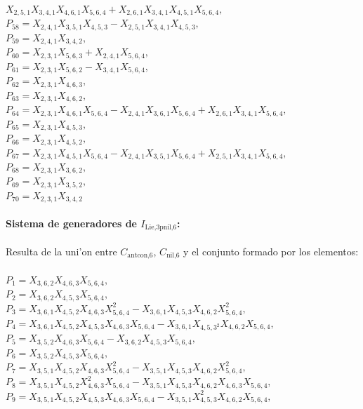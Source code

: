 \documentclass[10pt]{beamer}
\begin{document}
{$X_{2,5,1}X_{3,4,1}X_{4,6,1}X_{5,6,4}+X_{2,6,1}X_{3,4,1}X_{4,5,1}X_{5,6,4},$\\
$P_{58}=X_{2,4,1}X_{3,5,1}X_{4,5,3}-X_{2,5,1}X_{3,4,1}X_{4,5,3},$\\
$P_{59}=X_{2,4,1}X_{3,4,2},$\\
$P_{60}=X_{2,3,1}X_{5,6,3}+X_{2,4,1}X_{5,6,4},$\\
$P_{61}=X_{2,3,1}X_{5,6,2}-X_{3,4,1}X_{5,6,4},$\\
$P_{62}=X_{2,3,1}X_{4,6,3},$\\
$P_{63}=X_{2,3,1}X_{4,6,2},$\\
$P_{64}=X_{2,3,1}X_{4,6,1}X_{5,6,4}-X_{2,4,1}X_{3,6,1}X_{5,6,4}+X_{2,6,1}X_{3,4,1}X_{5,6,4},$\\
$P_{65}=X_{2,3,1}X_{4,5,3},$\\
$P_{66}=X_{2,3,1}X_{4,5,2},$\\
$P_{67}=X_{2,3,1}X_{4,5,1}X_{5,6,4}-X_{2,4,1}X_{3,5,1}X_{5,6,4}+X_{2,5,1}X_{3,4,1}X_{5,6,4},$\\
$P_{68}=X_{2,3,1}X_{3,6,2},$\\
$P_{69}=X_{2,3,1}X_{3,5,2},$\\
$P_{70}=X_{2,3,1}X_{3,4,2}$\\
\\
\textbf{Sistema de generadores de $I_{\text{Lie,3pnil,}6}$:}\\
\\
Resulta de la uni'on entre $C_{\text{antcon,}6}$, $C_{\text{nil,}6}$ y el conjunto formado por los elementos:\\
\\
$P_{1}=X_{3,6,2}X_{4,6,3}X_{5,6,4},$\\
$P_{2}=X_{3,6,2}X_{4,5,3}X_{5,6,4},$\\
$P_{3}=X_{3,6,1}X_{4,5,2}X_{4,6,3}X_{5,6,4}^2-X_{3,6,1}X_{4,5,3}X_{4,6,2}X_{5,6,4}^2,$\\
$P_{4}=X_{3,6,1}X_{4,5,2}X_{4,5,3}X_{4,6,3}X_{5,6,4}-X_{3,6,1}X_{4,5,3^2}X_{4,6,2}X_{5,6,4},$\\
$P_{5}=X_{3,5,2}X_{4,6,3}X_{5,6,4}-X_{3,6,2}X_{4,5,3}X_{5,6,4},$\\
$P_{6}=X_{3,5,2}X_{4,5,3}X_{5,6,4},$\\
$P_{7}=X_{3,5,1}X_{4,5,2}X_{4,6,3}X_{5,6,4}^2-X_{3,5,1}X_{4,5,3}X_{4,6,2}X_{5,6,4}^2,$\\
$P_{8}=X_{3,5,1}X_{4,5,2}X_{4,6,3}^2X_{5,6,4}-X_{3,5,1}X_{4,5,3}X_{4,6,2}X_{4,6,3}X_{5,6,4},$\\
$P_{9}=X_{3,5,1}X_{4,5,2}X_{4,5,3}X_{4,6,3}X_{5,6,4}-X_{3,5,1}X_{4,5,3}^2X_{4,6,2}X_{5,6,4},$\\
}
\end{document}
